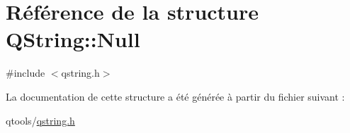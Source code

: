 \hypertarget{struct_q_string_1_1_null}{}\section{Référence de la structure Q\+String\+:\+:Null}
\label{struct_q_string_1_1_null}


{\ttfamily \#include $<$qstring.\+h$>$}



La documentation de cette structure a été générée à partir du fichier suivant \+:\begin{DoxyCompactItemize}
\item 
qtools/\hyperlink{qstring_8h}{qstring.\+h}\end{DoxyCompactItemize}
